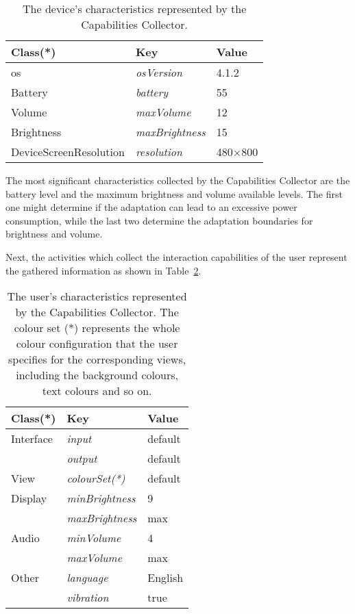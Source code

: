 \begin{table}
 \caption{The device's characteristics represented by the Capabilities Collector.}
 \label{tbl:device}
 \footnotesize
 \centering
\begin{tabular}{l l l}
  \hline 
  \textbf{Class(*)}& \textbf{Key} & \textbf{Value}		\\
  \hline
  \ac{os}	& \textit{osVersion}		& 4.1.2	\\
  Battery	& \textit{battery}		& 55		\\
  Volume	& \textit{maxVolume}		& 12		\\
  Brightness	& \textit{maxBrightness}	& 15		\\
  DeviceScreenResolution & \textit{resolution}	& 480×800	\\	
  \hline
\end{tabular}
\end{table}

The most significant characteristics collected by the Capabilities Collector
are the battery level and the maximum brightness and volume available levels.
The first one might determine if the adaptation can lead to an excessive power
consumption, while the last two determine the adaptation boundaries for 
brightness and volume.

Next, the activities which collect the interaction capabilities of the user
represent the gathered information as shown in Table~\ref{tbl:user}.

\begin{table}
 \caption{The user's characteristics represented by the Capabilities Collector.
 The colour set (*) represents the whole colour configuration that the user 
 specifies for the corresponding views, including the background colours, text 
 colours and so on.}
 \label{tbl:user}
 \footnotesize
 \centering
\begin{tabular}{l l l}
  \hline 
  \textbf{Class(*)}& \textbf{Key} & \textbf{Value}		\\
  \hline
  Interface 	& \textit{input}		& default	\\
		& \textit{output} 		& default	\\
  View		& \textit{colourSet(*)}		& default	\\
  Display 	& \textit{minBrightness}	& 9		\\ 
 		& \textit{maxBrightness}	& max		\\
  Audio 	& \textit{minVolume}		& 4		\\
 		& \textit{maxVolume} 		& max		\\
  Other 	& \textit{language}		& English	\\
 		& \textit{vibration} 		& true 		\\	
  \hline
\end{tabular}
\end{table}

